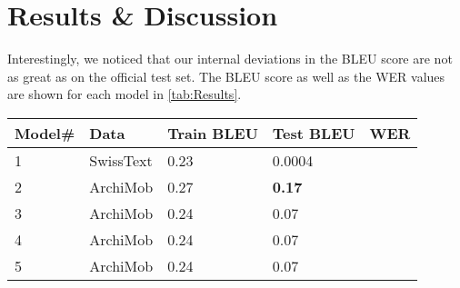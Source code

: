 \section{Results \& Discussion}
Interestingly, we noticed that our internal deviations in the BLEU score are not as great as on the official test set. The BLEU score as well as the WER values are shown for each model in
\cref{tab:Results}.

\begin{table*}[!t]
    \centering
    \begin{tabular}{lllll}
    \hline\textbf{Model\#}    & \textbf{Data} & \textbf{Train BLEU}   & \textbf{Test BLEU}  & \textbf{WER}  \\\hline
    1                   & SwissText     & 0.23                  & 0.0004                    &               \\
    2                   & ArchiMob      & 0.27                  & \textbf{0.17}             &               \\
    3                   & ArchiMob      & 0.24                  & 0.07                      &               \\
    4                   & ArchiMob      & 0.24                  & 0.07                      &               \\
    5                   & ArchiMob      & 0.24                  & 0.07                      &               \\
    \hline
    \end{tabular}
    \caption{Results}
    \label{tab:Results}
\end{table*}
